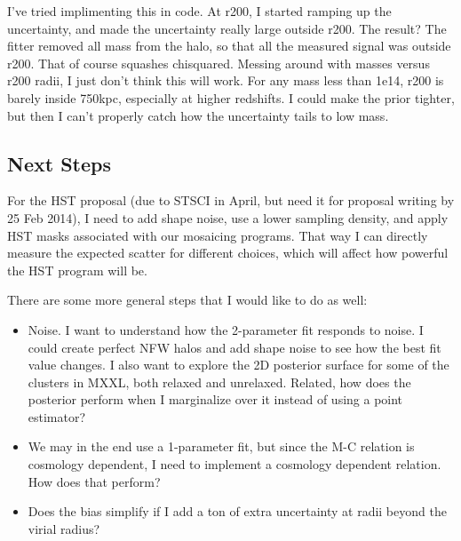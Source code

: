 \documentclass[11pt]{article}
\begin{document}
I've tried implimenting this in code. At r200, I started ramping up the uncertainty, and made the uncertainty really large outside r200. The result? The fitter removed all mass from the halo, so that all the measured signal was outside r200. That of course squashes chisquared. Messing around with masses versus r200 radii, I just don't think this will work. For any mass less than 1e14, r200 is barely inside 750kpc, especially at higher redshifts. I could make the prior tighter, but then I can't properly catch how the uncertainty tails to low mass.


\subsection{Next Steps}

For the HST proposal (due to STSCI in April, but need it for proposal writing by 25 Feb 2014), I need to add shape noise, use a lower sampling density, and apply HST masks associated with our mosaicing programs. That way I can directly measure the expected scatter for different choices, which will affect how powerful the HST program will be. 

There are some more general steps that I would like to do as well:
\begin{itemize}
\item Noise. I want to understand how the 2-parameter fit responds to noise. I could create perfect NFW halos and add shape noise to see how the best fit value changes. I also want to explore the 2D posterior surface for some of the clusters in MXXL, both relaxed and unrelaxed. Related, how does the posterior perform when I marginalize over it instead of using a point estimator?
\item We may in the end use a 1-parameter fit, but since the M-C relation is cosmology dependent, I need to implement a cosmology dependent relation. How does that perform?
\item Does the bias simplify if I add a ton of extra uncertainty at radii beyond the virial radius?
\end{itemize}



\clearpage \newpage
\end{document}
